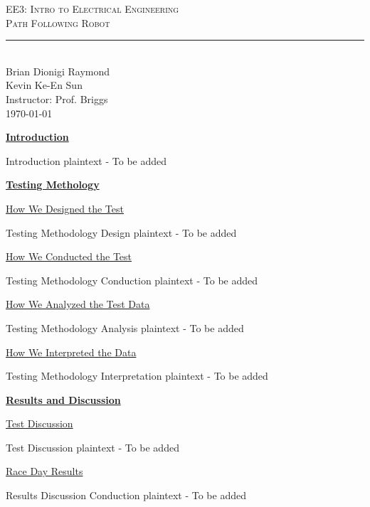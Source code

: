 \documentclass[]{report}
\newcommand{\classname}{EE3: Intro to Electrical Engineering}
\newcommand{\project}{Path Following Robot}
\newcommand{\authorname}{Brian Dionigi Raymond\\Kevin Ke-En Sun}
\newcommand{\instructor}{Prof. Briggs}
\newcommand{\sectionTitle}[1]{ {\large\textbf{\uline{#1}}} \\ \vspace{1.5em} }
\newcommand{\subsectionTitle}[1]{ {\hspace{2em}\uline{#1}} \\ \vspace{1em} }
\newcommand{\textIntro}{Introduction plaintext - To be added}
\newcommand{\textTestDesign}{Testing Methodology Design plaintext - To be added}
\newcommand{\textTestConduction}{Testing Methodology Conduction plaintext - To be added}
\newcommand{\textTestAnalysis}{Testing Methodology Analysis plaintext - To be added}
\newcommand{\textTestInterpretation}{Testing Methodology Interpretation plaintext - To be added}
\newcommand{\textTestDiscussion}{Test Discussion plaintext - To be added}
\newcommand{\textRaceResults}{Results Discussion Conduction plaintext - To be added}
\begin{document}
		
	\begin{center}
		{\LARGE \textsc{\classname \\ \project} \\ \vspace{4pt}}
		\rule[13pt]{\textwidth}{1pt} \\ %
		{\large \authorname \\ \vspace{10pt}
			Instructor: \instructor \\ \vspace{10pt}
			\today \\ \vspace{10pt}
		}
	\end{center}	
	
	\begin{flushleft}
		\sectionTitle{Introduction}
		
		\textIntro \\ \vspace{1em}
		
		\sectionTitle{Testing Methology}
		
		\subsectionTitle{How We Designed the Test}

		\textTestDesign \\ \vspace{1em}
		
		\subsectionTitle{How We Conducted the Test}

		\textTestConduction \\ \vspace{1em}
		
		\subsectionTitle{How We Analyzed the Test Data}

		\textTestAnalysis \\ \vspace{1em}
		
		\subsectionTitle{How We Interpreted the Data}

		\textTestInterpretation \\ \vspace{1em}
		
		\sectionTitle{Results and Discussion}
			
			\subsectionTitle{Test Discussion}

			\textTestDiscussion \\ \vspace{1em}
			
			\subsectionTitle{Race Day Results}

			\textRaceResults \\ \vspace{1em}
			

\end{flushleft}
\end{document}
